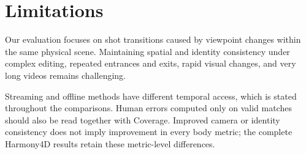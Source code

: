 \FloatBarrier
\section{Limitations}
\label{app:limitations}

Our evaluation focuses on shot transitions caused by viewpoint changes within
the same physical scene. Maintaining spatial and identity consistency under
complex editing, repeated entrances and exits, rapid visual changes, and very
long videos remains challenging.

Streaming and offline methods have different temporal access, which is stated
throughout the comparisons. Human errors computed only on valid matches should
also be read together with Coverage. Improved camera or identity consistency
does not imply improvement in every body metric; the complete Harmony4D
results retain these metric-level differences.
